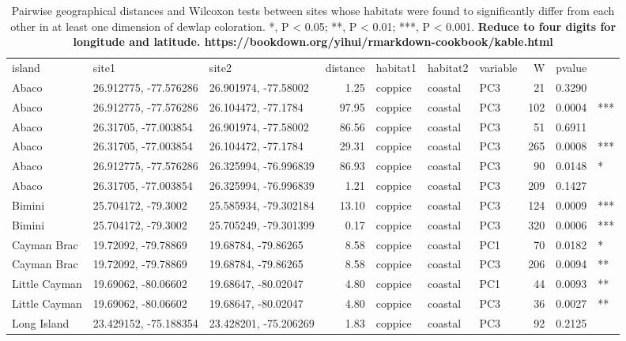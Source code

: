 \begin{table}[H]
    \caption{Pairwise geographical distances and Wilcoxon tests between sites whose habitats were found to significantly differ from each other in at least one dimension of dewlap coloration. *, P < 0.05; **, P < 0.01; ***, P < 0.001. \textbf{Reduce to four digits for longitude and latitude. https://bookdown.org/yihui/rmarkdown-cookbook/kable.html}}
    \centering
    \begin{tabular}{l|l|l|r|l|l|l|r|l|l}
    island & site1 & site2 & distance & habitat1 & habitat2 & variable & W & pvalue & \\
        Abaco & 26.912775, -77.576286 & 26.901974, -77.58002 & 1.25 & coppice & coastal & PC3 & 21 & 0.3290 & \\
        Abaco & 26.912775, -77.576286 & 26.104472, -77.1784 & 97.95 & coppice & coastal & PC3 & 102 & 0.0004 & ***\\
        Abaco & 26.31705, -77.003854 & 26.901974, -77.58002 & 86.56 & coppice & coastal & PC3 & 51 & 0.6911 & \\
        Abaco & 26.31705, -77.003854 & 26.104472, -77.1784 & 29.31 & coppice & coastal & PC3 & 265 & 0.0008 & ***\\
        Abaco & 26.912775, -77.576286 & 26.325994, -76.996839 & 86.93 & coppice & coastal & PC3 & 90 & 0.0148 & *\\
        Abaco & 26.31705, -77.003854 & 26.325994, -76.996839 & 1.21 & coppice & coastal & PC3 & 209 & 0.1427 & \\
        Bimini & 25.704172, -79.3002 & 25.585934, -79.302184 & 13.10 & coppice & coastal & PC3 & 124 & 0.0009 & ***\\
        Bimini & 25.704172, -79.3002 & 25.705249, -79.301399 & 0.17 & coppice & coastal & PC3 & 320 & 0.0006 & ***\\
        Cayman Brac & 19.72092, -79.78869 & 19.68784, -79.86265 & 8.58 & coppice & coastal & PC1 & 70 & 0.0182 & *\\
        Cayman Brac & 19.72092, -79.78869 & 19.68784, -79.86265 & 8.58 & coppice & coastal & PC3 & 206 & 0.0094 & **\\
        Little Cayman & 19.69062, -80.06602 & 19.68647, -80.02047 & 4.80 & coppice & coastal & PC1 & 44 & 0.0093 & **\\
        Little Cayman & 19.69062, -80.06602 & 19.68647, -80.02047 & 4.80 & coppice & coastal & PC3 & 36 & 0.0027 & **\\
        Long Island & 23.429152, -75.188354 & 23.428201, -75.206269 & 1.83 & coppice & coastal & PC3 & 92 & 0.2125 & \\

\end{tabular}
\end{table}
